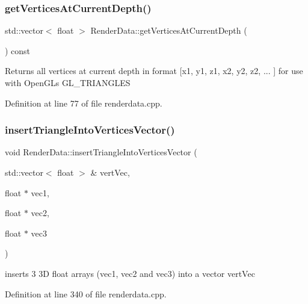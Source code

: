 \subsubsection{\texorpdfstring{get\+Vertices\+At\+Current\+Depth()}{getVerticesAtCurrentDepth()}}
{\footnotesize\ttfamily std\+::vector$<$ float $>$ Render\+Data\+::get\+Vertices\+At\+Current\+Depth (\begin{DoxyParamCaption}{ }\end{DoxyParamCaption}) const}

\begin{DoxyReturn}{Returns}
all vertices at current depth in format \mbox{[}x1, y1, z1, x2, y2, z2, ... \mbox{]} for use with Open\+GL\textquotesingle{}s G\+L\+\_\+\+T\+R\+I\+A\+N\+G\+L\+ES 
\end{DoxyReturn}


Definition at line 77 of file renderdata.\+cpp.

\mbox{\label{class_render_data_a4fca77ce81a628de0ddaeb7d75a4c371}} 
\subsubsection{\texorpdfstring{insert\+Triangle\+Into\+Vertices\+Vector()}{insertTriangleIntoVerticesVector()}}
{\footnotesize\ttfamily void Render\+Data\+::insert\+Triangle\+Into\+Vertices\+Vector (\begin{DoxyParamCaption}\item[{std\+::vector$<$ float $>$ \&}]{vert\+Vec,  }\item[{float $\ast$}]{vec1,  }\item[{float $\ast$}]{vec2,  }\item[{float $\ast$}]{vec3 }\end{DoxyParamCaption})\hspace{0.3cm}{\ttfamily [private]}}

inserts 3 3D float arrays (vec1, vec2 and vec3) into a vector vert\+Vec 

Definition at line 340 of file renderdata.\+cpp.

\mbox{\label{class_render_data_ac161f29f7d6ae6fd3912e8af7bdccdfd}} 
